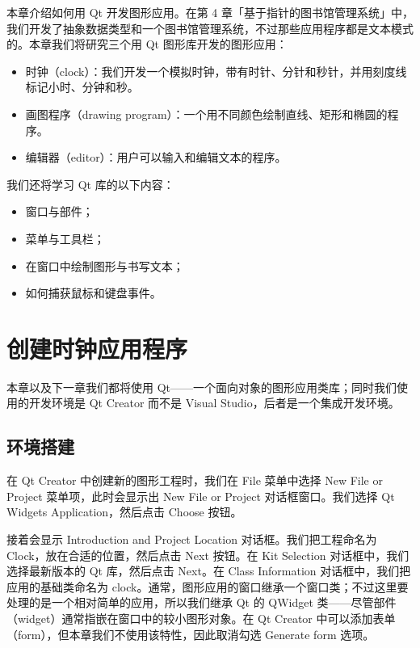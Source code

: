 \renewcommand{\codeInset}{18bp}
本章介绍如何用 Qt 开发图形应用。在第 4 章「基于指针的图书馆管理系统」中，我们开发了抽象数据类型和一个图书馆管理系统，不过那些应用程序都是文本模式的。本章我们将研究三个用 Qt 图形库开发的图形应用：

\begin{itemize}
\item 时钟（clock）：我们开发一个模拟时钟，带有时针、分针和秒针，并用刻度线标记小时、分钟和秒。
\item 画图程序（drawing program）：一个用不同颜色绘制直线、矩形和椭圆的程序。
\item 编辑器（editor）：用户可以输入和编辑文本的程序。
\end{itemize}

我们还将学习 Qt 库的以下内容：

\begin{itemize}
\item 窗口与部件；
\item 菜单与工具栏；
\item 在窗口中绘制图形与书写文本；
\item 如何捕获鼠标和键盘事件。
\end{itemize}

\section{创建时钟应用程序}

本章以及下一章我们都将使用 Qt——一个面向对象的图形应用类库；同时我们使用的开发环境是 Qt Creator 而不是 Visual Studio，后者是一个集成开发环境。

\subsection{环境搭建}

在 Qt Creator 中创建新的图形工程时，我们在 File 菜单中选择 New File or Project 菜单项，此时会显示出 New File or Project 对话框窗口。我们选择 Qt Widgets Application，然后点击 Choose 按钮。

接着会显示 Introduction and Project Location 对话框。我们把工程命名为 Clock，放在合适的位置，然后点击 Next 按钮。在 Kit Selection 对话框中，我们选择最新版本的 Qt 库，然后点击 Next。在 Class Information 对话框中，我们把应用的基础类命名为 clock。通常，图形应用的窗口继承一个窗口类；不过这里要处理的是一个相对简单的应用，所以我们继承 Qt 的 QWidget 类——尽管部件（widget）通常指嵌在窗口中的较小图形对象。在 Qt Creator 中可以添加表单（form），但本章我们不使用该特性，因此取消勾选 Generate form 选项。

